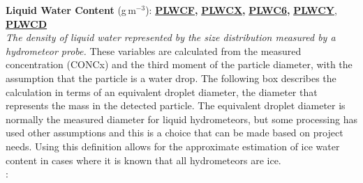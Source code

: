 \begin{hangparagraphs}
\textbf{Liquid Water Content }(g\,m\textbf{$^{-3}$}):\textbf{
}\textbf{\uline{PLWCF}}\textbf{,
}\textbf{\uline{PLWCX}}\textbf{,
}\textbf{\uline{PLWC6}}\textbf{,
}\textbf{\uline{PLWCY}}, \textbf{\uline{PLWCD}}\\
\emph{The density of liquid
water represented by the size distribution measured by a hydrometeor
probe.}
These variables are calculated from the measured concentration (CONCx)
and the third moment of the particle diameter, with the assumption
that the particle is a water drop. The following box describes the
calculation in terms of an equivalent droplet diameter,
the diameter that represents the mass in the detected particle. The
equivalent droplet diameter is normally the measured diameter for
liquid hydrometeors, but some processing has used other assumptions
and this is a choice that can be made based on project needs. Using
this definition allows for the approximate estimation of ice
water content in cases where it is known that all hydrometeors are
ice. \\
:\\
\\


\end{hangparagraphs}
